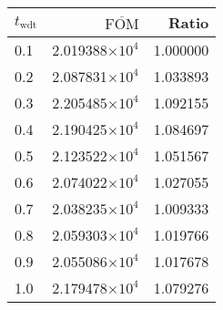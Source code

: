 \begin{tabular}{lrr}
\toprule
$t_{\mathrm{wdt}}$ & $\overline{\mathrm{FOM}}$ &    Ratio \\
\midrule
               0.1 &   2.019388$\times 10^{4}$ & 1.000000 \\
               0.2 &   2.087831$\times 10^{4}$ & 1.033893 \\
               0.3 &   2.205485$\times 10^{4}$ & 1.092155 \\
               0.4 &   2.190425$\times 10^{4}$ & 1.084697 \\
               0.5 &   2.123522$\times 10^{4}$ & 1.051567 \\
               0.6 &   2.074022$\times 10^{4}$ & 1.027055 \\
               0.7 &   2.038235$\times 10^{4}$ & 1.009333 \\
               0.8 &   2.059303$\times 10^{4}$ & 1.019766 \\
               0.9 &   2.055086$\times 10^{4}$ & 1.017678 \\
               1.0 &   2.179478$\times 10^{4}$ & 1.079276 \\
\bottomrule
\end{tabular}
